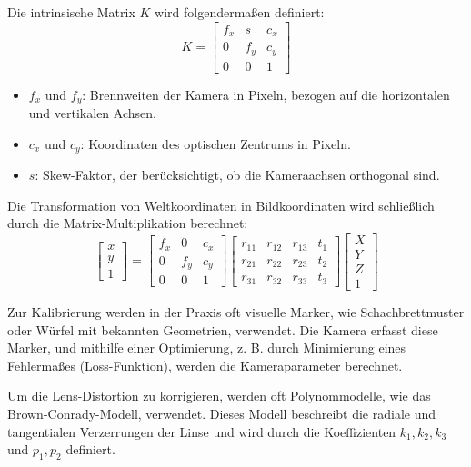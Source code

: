 Die intrinsische Matrix \( K \) wird folgendermaßen definiert:
\[
K = 
\begin{bmatrix}
f_x & s & c_x \\
0 & f_y & c_y \\
0 & 0 & 1
\end{bmatrix}
\]
\begin{itemize}
    \item \( f_x \) und \( f_y \): Brennweiten der Kamera in Pixeln, bezogen auf die horizontalen und vertikalen Achsen.
    \item \( c_x \) und \( c_y \): Koordinaten des optischen Zentrums in Pixeln.
    \item \( s \): Skew-Faktor, der berücksichtigt, ob die Kameraachsen orthogonal sind.
\end{itemize}

Die Transformation von Weltkoordinaten in Bildkoordinaten wird schließlich durch die Matrix-Multiplikation berechnet:
\[
\begin{bmatrix}
x \\ y \\ 1
\end{bmatrix}
= 
\begin{bmatrix}
f_x & 0 & c_x \\
0 & f_y & c_y \\
0 & 0 & 1
\end{bmatrix}
\begin{bmatrix}
r_{11} & r_{12} & r_{13} & t_1 \\
r_{21} & r_{22} & r_{23} & t_2 \\
r_{31} & r_{32} & r_{33} & t_3
\end{bmatrix}
\begin{bmatrix}
X \\ Y \\ Z \\ 1
\end{bmatrix}
\]

Zur Kalibrierung werden in der Praxis oft visuelle Marker, wie Schachbrettmuster oder Würfel mit bekannten Geometrien, verwendet. Die Kamera erfasst diese Marker, und mithilfe einer Optimierung, z. B. durch Minimierung eines Fehlermaßes (Loss-Funktion), werden die Kameraparameter berechnet.

Um die Lens-Distortion zu korrigieren, werden oft Polynommodelle, wie das Brown-Conrady-Modell, verwendet. Dieses Modell beschreibt die radiale und tangentialen Verzerrungen der Linse und wird durch die Koeffizienten \( k_1, k_2, k_3 \) und \( p_1, p_2 \) definiert.

